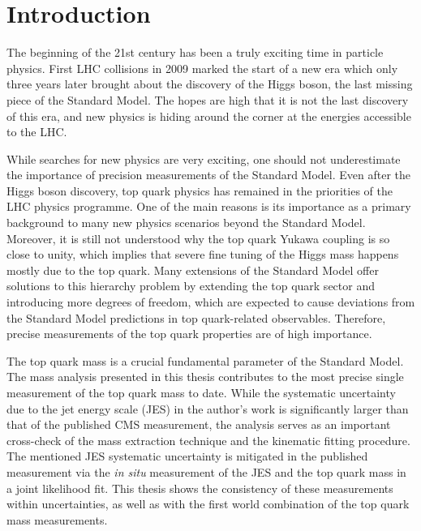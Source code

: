 
\chapter{Introduction}
\label{c:intro}
\ifpdf
    \graphicspath{{01_Introduction/plots/}}
\else
    \graphicspath{{01_Introduction/plots/EPS/}{01_Introduction/plots/}}
\fi

The beginning of the 21st century has been a truly exciting time in particle physics. First LHC collisions in 2009
marked the start of a new era which only three years later brought about the discovery of the Higgs boson, the last
missing piece of the Standard Model. The hopes are high that it is not the last discovery of this era, and new physics
is hiding around the corner at the energies accessible to the LHC.

While searches for new physics are very exciting, one should not underestimate the importance of precision measurements
of the Standard Model. Even after the Higgs boson discovery, top quark physics has remained in the priorities of the LHC
physics programme. One of the main reasons is its importance as a primary background to many new physics scenarios
beyond the Standard Model. Moreover, it is still not understood why the top quark Yukawa coupling is so close to unity,
which implies that severe fine tuning of the Higgs mass happens mostly due to the top quark. Many extensions of the
Standard Model offer solutions to this hierarchy problem by extending the top quark sector and introducing more degrees
of freedom, which are expected to cause deviations from the Standard Model predictions in top quark-related observables.
Therefore, precise measurements of the top quark properties are of high importance.

The top quark mass is a crucial fundamental parameter of the Standard Model. The mass analysis presented in this thesis
contributes to the most precise single measurement of the top quark mass to date. While the systematic uncertainty due
to the jet energy scale (JES) in the author's work is significantly larger than that of the published CMS measurement,
the analysis serves as an important cross-check of the mass extraction technique and the kinematic fitting procedure.
The mentioned JES systematic uncertainty is mitigated in the published measurement via the \textit{in situ} measurement
of the JES and the top quark mass in a joint likelihood fit. This thesis shows the consistency of these measurements
within uncertainties, as well as with the first world combination of the top quark mass measurements.

